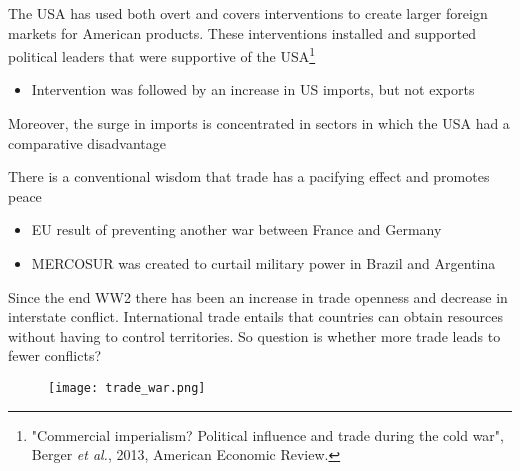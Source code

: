 \documentclass{beamer}
\begin{document}
\begin{frame}
  The USA has used both overt and covers interventions to create larger foreign markets for American products.
  These interventions installed and supported political leaders that were supportive of the USA\footnote{"Commercial imperialism? Political influence and trade during the cold war", Berger \textit{et al.}, 2013, American Economic Review.}
  \begin{itemize}
    \item Intervention was followed by an increase in US imports, but not exports    
  \end{itemize}
  Moreover, the surge in imports is concentrated in sectors in which the USA had a comparative disadvantage
\end{frame}

\begin{frame}
  There is a conventional wisdom that trade has a pacifying effect and promotes peace
  \begin{itemize}
    \item EU result of preventing another war between France and Germany    
    \item MERCOSUR was created to curtail military power in Brazil and Argentina
  \end{itemize}
  \medskip
  Since the end WW2 there has been an increase in trade openness and decrease in interstate conflict. 
  International trade entails that countries can obtain resources without having to control territories.
  So question is whether more trade leads to fewer conflicts?
\end{frame}

\begin{frame}
  \begin{figure}
    \texttt{[image: trade\_war.png]}
  \end{figure}
\end{frame}
\end{document}
